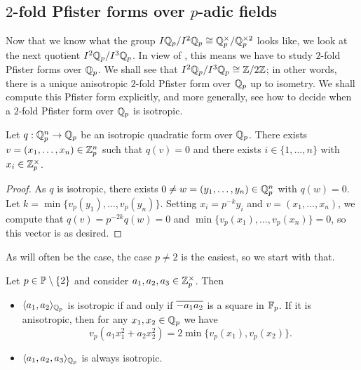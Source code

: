 \documentclass[12pt, leqno, british]{amsart}
\begin{document}
\subsection{$2$-fold Pfister forms over $p$-adic fields}
Now that we know what the group $I\mathbb Q_p/I^2\mathbb Q_p \cong \mathbb Q_p^\times/\mathbb Q_p^{\times 2}$ looks like, we look at the next quotient $I^2\mathbb Q_p/I^3\mathbb Q_p$.
In view of , this means we have to study $2$-fold Pfister forms over $\mathbb Q_p$.
We shall see that $I^2\mathbb Q_p/I^3\mathbb Q_p \cong \mathbb Z/2\mathbb Z$; in other words, there is a unique anisotropic $2$-fold Pfister form over $\mathbb Q_p$ up to isometry.
We shall compute this Pfister form explicitly, and more generally, see how to decide when a $2$-fold Pfister form over $\mathbb Q_p$ is isotropic.

\begin{lem}\label{L:isotropic-vector-in-zzp}
Let $q : \mathbb Q_p^n \to \mathbb Q_p$ be an isotropic quadratic form over $\mathbb Q_p$.
There exists $v = (x_1, \ldots, x_n) \in \mathbb Z_p^n$ such that $q(v) = 0$ and there exists $i \in \lbrace 1, \ldots, n \rbrace$ with $x_i \in \mathbb Z_p^\times$.
\end{lem}
\begin{proof}
As $q$ is isotropic, there exists $0 \neq w = (y_1, \ldots, y_n) \in \mathbb Q_p^n$ with $q(w) = 0$.
Let $k = \min \lbrace v_p(y_1), \ldots, v_p(y_n) \rbrace$.
Setting $x_i = p^{-k}y_i$ and $v = (x_1, \ldots, x_n)$, we compute that $q(v) = p^{-2k}q(w) = 0$ and $\min \lbrace v_p(x_1), \ldots, v_p(x_n) \rbrace = 0$, so this vector is as desired.
\end{proof}
As will often be the case, the case $p\neq 2$ is the easiest, so we start with that.
\begin{lem}\label{L:qqp-odd-3d-form}
Let $p \in \mathbb P \setminus \lbrace 2 \rbrace$ and consider $a_1, a_2, a_3 \in \mathbb Z_p^\times$.
Then
\begin{itemize}
\item $\langle a_1, a_2 \rangle_{\mathbb Q_p}$ is isotropic if and only if $\overline{-a_1a_2}$ is a square in $\mathbb F_p$.
If it is anisotropic, then for any $x_1, x_2 \in \mathbb Q_p$ we have
\begin{displaymath}
v_p(a_1x_1^2 + a_2x_2^2) = 2\min \lbrace v_p(x_1), v_p(x_2) \rbrace.
\end{displaymath}
\item $\langle a_1, a_2, a_3 \rangle_{\mathbb Q_p}$ is always isotropic.
\end{itemize}
\end{lem}
\end{document}
